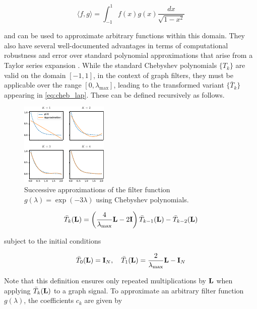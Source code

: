 \begin{equation}
    \langle f, g \rangle = \int_{-1}^1 f(x) g(x) \frac{dx}{\sqrt{1 - x^2}}
\end{equation}

and can be used to approximate arbitrary functions within this domain. They also have several well-documented advantages in terms of computational robustness and error over standard polynomial approximations that arise from a Taylor series expansion \citep{Rivlin2020}. While the standard Chebyshev polynomials $\{T_k\}$ are valid on the domain $[-1, 1]$, in the context of graph filters, they must be applicable over the range $[0, \lambda_{\text{max}}]$, leading to the transformed variant $\{\bar{T}_k\}$ appearing in \cref{eq:cheb_lap}. These can be defined recursively as follows. 


\begin{figure}[t]
	\centering
		\includegraphics[width=0.55\linewidth]{Figures/cheb.pdf}
	\caption[Successive approximations of a filter function using Chebyshev polynomials.]{Successive approximations of the filter function $g(\lambda) = \exp(-3\lambda)$ using Chebyshev polynomials. }
	\label{fig:Chebyshev}
\end{figure}

\begin{equation}
    \bar{T}_k(\mathbf{L}) = \left(\frac{4 }{\lambda_{\text{max}}}  \mathbf{L}  - 2\mathbf{I} \right) \bar{T}_{k-1}(\mathbf{L}) - \bar{T}_{k-2}(\mathbf{L})
\end{equation}

subject to the initial conditions

\begin{equation}
    \bar{T}_0(\mathbf{L}) = \mathbf{I}_N, \quad \bar{T}_1(\mathbf{L}) = \frac{2}{\lambda_{\text{max}}} \mathbf{L} - \mathbf{I}_N
\end{equation}

Note that this definition ensures only repeated multiplications by $\mathbf{L}$ when applying $\bar{T}_k(\mathbf{L})$ to a graph signal. To approximate an arbitrary filter function $g(\lambda)$, the coefficients $c_k$ are given by 

